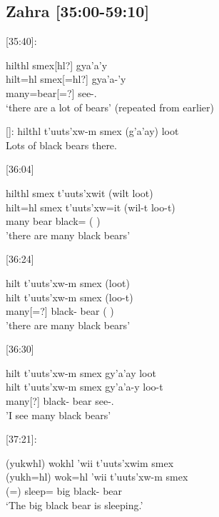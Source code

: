 \subsection{Zahra [35:00-59:10]}

[35:40]:\textit{}

\begin{exe}
    \ex \glll 
    hilthl smex[hl?] gya'a'y \\
    hilt=hl smex[=hl?] gya'a-'y \\
    many=\Cn bear[=\Cn?] see-\Fsg.\Ii \\
    `there are a lot of bears' (repeated from earlier)
\end{exe}

[]: hilthl t'uuts'xw-m smex  (g’a’ay) loot \\
Lots of black bears there.

[36:04]
\begin{exe}
    \ex \glll 
    hilthl smex t'uuts'xwit (wilt loot) \\
    hilt=hl smex t'uuts'xw=it (wil-t loo-t) \\
    many\Cn{} bear black=\Sx{} ( ) \\
    \glt 'there are many black bears' 
\end{exe}

[36:24]
\begin{exe}
\ex \glll 
    hilt t'uuts'xw-m smex (loot) \\
    hilt t'uuts'xw-m smex (loo-t) \\
    many[=\Cn{}?] black-\Attr{} bear ( ) \\
    \glt 'there are many black bears' 
\end{exe}

[36:30]
\begin{exe}
\ex \glll 
    hilt t'uuts'xw-m smex gy'a'ay loot \\
    hilt t'uuts'xw-m smex gy'a'a-y loo-t \\
    many[\Cn{}?] black-\Attr{} bear see-\Fsg.\Ii{}  \\
    \glt 'I see many black bears' 
\end{exe}

[37:21]: 
\begin{exe}
    \ex \glll
    (yukwhl) wokhl 'wii t'uuts'xwim smex  \\
    (yukh=hl) wok=hl 'wii t'uuts'xw-m smex  \\
    (\Prog=\Cn) sleep=\Cn{} big black-\Attr{} bear \\
    \glt `The big black bear is sleeping.'
\end{exe}

